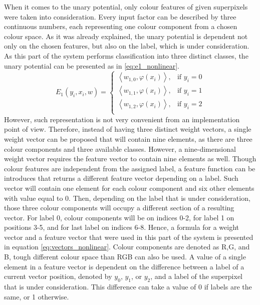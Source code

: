 When it comes to the unary potential, only colour features of given superpixels were taken into consideration. Every  input factor can be described by three continuous numbers, each representing one colour component from a chosen colour space. As it was already explained, the unary potential is dependent not only on the chosen features, but also on the label, which is under consideration. As this part of the system performs classification into three distinct classes, the unary potential can be presented as in \ref{eq:e1_nonlinear}. 
\begin{equation}
    \label{eq:e1_nonlinear}
    E_1(y_i,x_i,w)= 
    \begin{cases}
        \left \langle w_{1,0}, \varphi({x_i}) \right \rangle , &  \text{if } y_i = 0\\ 
        \left \langle w_{1,1}, \varphi({x_i}) \right \rangle , & \text{if } y_i = 1\\
        \left \langle w_{1,2}, \varphi({x_i}) \right \rangle , & \text{if } y_i = 2\\  
    \end{cases}
\end{equation}
However, such representation is not very convenient from an implementation point of view. Therefore, instead of having three distinct weight vectors, a single weight vector can be proposed that will contain nine elements, as there are three colour components and three available classes. However, a nine-dimensional weight vector requires the feature vector to contain nine elements as well. Though colour features are independent from the assigned label, a feature function can be introduces that returns a different feature vector depending on a label. Such vector will contain one element for each colour component and six other elements with value equal to 0. Then, depending on the label that is under consideration, those three colour components will occupy a different section of a resulting vector. For label 0, colour components will be on indices 0-2, for label 1 on positions 3-5, and for last label on indices 6-8. Hence, a formula for a weight vector and a feature vector that were used in this part of the system is presented in equation \ref{eq:vectors_nonlinear}. Colour components are denoted as R,G, and B, tough different colour space than RGB can also be used. A value of a single element in a feature vector is dependent on the difference between a label of a current vector position, denoted by $y_0$, $y_1$, or $y_2$, and a label of the superpixel that is under consideration. This difference can take a value of 0 if labels are the same, or 1 otherwise.
